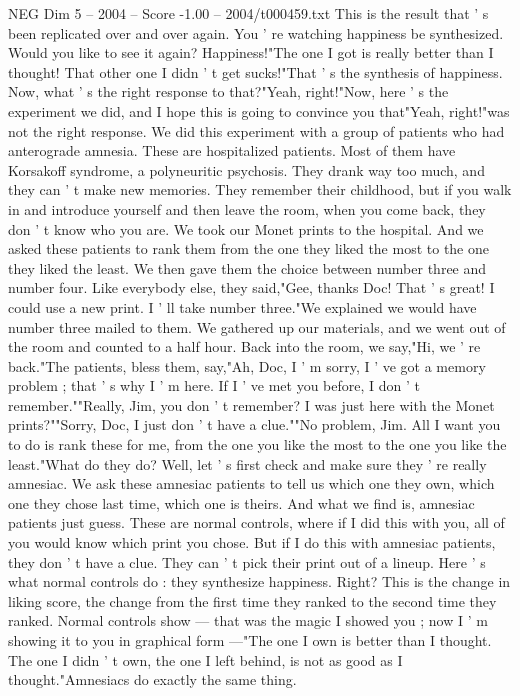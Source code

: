 \begin{textsample}{NEG Dim 5 – 2004 – Score -1.00 – 2004/t000459.txt}
This is the result that ' s been replicated over and over again.
You ' re watching happiness be synthesized.
Would you like to see it again?
Happiness!"The one I got is really better than I thought!
That other one I didn ' t get sucks!"That ' s the synthesis of happiness.
Now, what ' s the right response to that?"Yeah, right!"Now, here ' s the experiment we did, and I hope this is going to convince you that"Yeah, right!"was not the right response.
We did this experiment with a group of patients who had anterograde amnesia.
These are hospitalized patients.
Most of them have Korsakoff syndrome, a polyneuritic psychosis.
They drank way too much, and they can ' t make new memories.
They remember their childhood, but if you walk in and introduce yourself and then leave the room, when you come back, they don ' t know who you are.
We took our Monet prints to the hospital.
And we asked these patients to rank them from the one they liked the most to the one they liked the least.
We then gave them the choice between number three and number four.
Like everybody else, they said,"Gee, thanks Doc!
That ' s great!
I could use a new print.
I ' ll take number three."We explained we would have number three mailed to them.
We gathered up our materials, and we went out of the room and counted to a half hour.
Back into the room, we say,"Hi, we ' re back."The patients, bless them, say,"Ah, Doc, I ' m sorry, I ' ve got a memory problem ; that ' s why I ' m here.
If I ' ve met you before, I don ' t remember.""Really, Jim, you don ' t remember?
I was just here with the Monet prints?""Sorry, Doc, I just don ' t have a clue.""No problem, Jim.
All I want you to do is rank these for me, from the one you like the most to the one you like the least."What do they do?
Well, let ' s first check and make sure they ' re really amnesiac.
We ask these amnesiac patients to tell us which one they own, which one they chose last time, which one is theirs.
And what we find is, amnesiac patients just guess.
These are normal controls, where if I did this with you, all of you would know which print you chose.
But if I do this with amnesiac patients, they don ' t have a clue.
They can ' t pick their print out of a lineup.
Here ' s what normal controls do : they synthesize happiness.
Right?
This is the change in liking score, the change from the first time they ranked to the second time they ranked.
Normal controls show — that was the magic I showed you ; now I ' m showing it to you in graphical form —"The one I own is better than I thought.
The one I didn ' t own, the one I left behind, is not as good as I thought."Amnesiacs do exactly the same thing.

\end{textsample}
